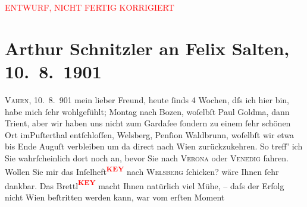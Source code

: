 
\begin{center}
            \textcolor{red}{ENTWURF, NICHT FERTIG KORRIGIERT}
                      \end{center}
            
         
         \newcommand{\erwaehntePersonen}{Personen: Anton Bettelheim, Eduard Devrient, Paul Goldmann, Felix Salten}
         \newcommand{\erwaehnteOrte}{Orte: Bozen, Lago di Garda, Pustertal, Trient, Vahrn, Venedig, Verona, Welsberg-Taisten, Wien, Wildbad Waldbrunn}
         \newcommand{\erwaehnteWerke}{Werke: Allgemeine Zeitung, Literatur, Zum Säkulartag Eduard Devrients}
               \section[Arthur Schnitzler an Felix Salten, 10. 8. 1901]{ Arthur Schnitzler an Felix Salten, 10. 8. 1901}\nopagebreak{}\rehead{ }\begin{ledgroupsized}[t]{13cm}\normalsize\beginnumbering \toendnotes[C]{\smallbreak\pagebreak[2]} 
\toendnotes[C]{\smallbreak}\pstart
           \raggedleft{}{\pb}\textsc{Vahrn}, 10. 8. 901\pend
           \pstart
           mein lieber Freund, heute ſinds 4 Wochen, dſs ich hier bin, habe mich ſehr wohlgefühlt;
                  Montag nach Bozen, woſelbſt Paul Goldma{\geminationn}, dann
               Trient, aber wir haben uns nicht zum Gardaſee ſondern zu einem ſehr schönen Ort imPuſterthal entſchloſſen, Welsberg, Penſion {\pb}Waldbrunn, woſelbſt wir
               etwa bis Ende Auguſt verbleiben um da{\geminationn}
               direct nach Wien zurückzukehren. So treff’ ich Sie
               wahrſcheinlich dort noch an, bevor Sie nach \textsc{Verona} oder \textsc{Venedig} fahren. Wollen Sie mir das Inſelheft\textcolor{red}{\textsuperscript{\textbf{KEY}}} nach \textsc{Welsberg} ſchicken? wäre Ihnen ſehr dankbar. Das Brettl\textcolor{red}{\textsuperscript{\textbf{KEY}}} macht Ihnen natürlich viel Mühe, {\pb}– daſs der Erfolg nicht Wien beſtritten werden kann, war vom erſten Moment

\end{ledgroupsized}
